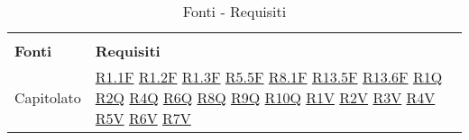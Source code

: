 
\begin{center}
    \centering
    \renewcommand{\arraystretch}{1.8}
    \label{tab:FontiRequisiti}
    \begin{longtable}[!h]{m{50px} m{50px}}
        \rowcolor{white}\caption{Fonti - Requisiti}                                    \\
        \rowcolor{logo!70} \textbf{Fonti} & \textbf{Requisiti}                         \\
        Capitolato                        & \hyperref[tab:RequisitiFunzionali]{R1.1F}
        \newline \hyperref[tab:RequisitiFunzionali]{R1.2F}
        \newline \hyperref[tab:RequisitiFunzionali]{R1.3F}
        \newline \hyperref[tab:RequisitiFunzionali]{R5.5F}
        \newline \hyperref[tab:RequisitiFunzionali]{R8.1F}
        \newline \hyperref[tab:RequisitiFunzionali]{R13.5F}
        \newline \hyperref[tab:RequisitiFunzionali]{R13.6F}
        \newline \hyperref[tab:RequisitiQualita]{R1Q}
        \newline \hyperref[tab:RequisitiQualita]{R2Q}
        \newline \hyperref[tab:RequisitiQualita]{R4Q}
        \newline \hyperref[tab:RequisitiQualita]{R6Q}
        \newline \hyperref[tab:RequisitiQualita]{R8Q}
        \newline \hyperref[tab:RequisitiQualita]{R9Q}
        \newline \hyperref[tab:RequisitiQualita]{R10Q}
        \newline \hyperref[tab:RequisitiVincolo]{R1V}
        \newline \hyperref[tab:RequisitiVincolo]{R2V}
        \newline \hyperref[tab:RequisitiVincolo]{R3V}
        \newline \hyperref[tab:RequisitiVincolo]{R4V}
        \newline \hyperref[tab:RequisitiVincolo]{R5V}
        \newline \hyperref[tab:RequisitiVincolo]{R6V}
        \newline \hyperref[tab:RequisitiVincolo]{R7V}

\end{longtable}
\end{center}
